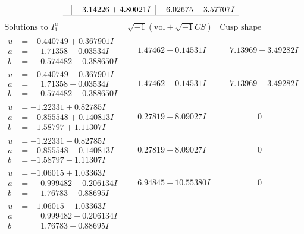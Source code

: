 \documentclass[1p]{elsarticle_modified}
\theoremstyle{definition}
\newcommand{\I}{\sqrt{-1}}
\begin{document}
$$\begin{array}{c|c|c}
 & -3.14226 + 4.80021 I & \phantom{-}6.02675 - 3.57707 I\\
 \hline 
 \end{array}$$\newpage$$\begin{array}{c|c|c}  
\text{Solutions to }I^u_{1}& \I (\text{vol} + \sqrt{-1}CS) & \text{Cusp shape}\\
 \hline 
\begin{aligned}
u &= -0.440749 + 0.367901 I \\
a &= \phantom{-}1.71358 + 0.03534 I \\
b &= \phantom{-}0.574482 - 0.388650 I\end{aligned}
 & \phantom{-}1.47462 - 0.14531 I & \phantom{-}7.13969 + 3.49282 I \\ \hline\begin{aligned}
u &= -0.440749 - 0.367901 I \\
a &= \phantom{-}1.71358 - 0.03534 I \\
b &= \phantom{-}0.574482 + 0.388650 I\end{aligned}
 & \phantom{-}1.47462 + 0.14531 I & \phantom{-}7.13969 - 3.49282 I \\ \hline\begin{aligned}
u &= -1.22331 + 0.82785 I \\
a &= -0.855548 + 0.140813 I \\
b &= -1.58797 + 1.11307 I\end{aligned}
 & \phantom{-}0.27819 + 8.09027 I & \phantom{-0.000000 } 0 \\ \hline\begin{aligned}
u &= -1.22331 - 0.82785 I \\
a &= -0.855548 - 0.140813 I \\
b &= -1.58797 - 1.11307 I\end{aligned}
 & \phantom{-}0.27819 - 8.09027 I & \phantom{-0.000000 } 0 \\ \hline\begin{aligned}
u &= -1.06015 + 1.03363 I \\
a &= \phantom{-}0.999482 + 0.206134 I \\
b &= \phantom{-}1.76783 - 0.88695 I\end{aligned}
 & \phantom{-}6.94845 + 10.55380 I & \phantom{-0.000000 } 0 \\ \hline\begin{aligned}
u &= -1.06015 - 1.03363 I \\
a &= \phantom{-}0.999482 - 0.206134 I \\
b &= \phantom{-}1.76783 + 0.88695 I\end{aligned}

\end{array}$$
\end{document}
